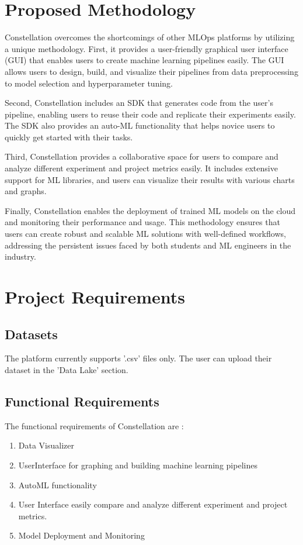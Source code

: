 \documentclass[12pt,a4paper]{report}     %
\begin{document}
\begin{normalsize}
{\section{Proposed Methodology}
Constellation overcomes the shortcomings of other MLOps platforms by utilizing a unique methodology. First, it provides a user-friendly graphical user interface (GUI) that enables users to create machine learning pipelines easily. The GUI allows users to design, build, and visualize their pipelines from data preprocessing to model selection and hyperparameter tuning.
\par
Second, Constellation includes an SDK that generates code from the user's pipeline, enabling users to reuse their code and replicate their experiments easily. The SDK also provides an auto-ML functionality that helps novice users to quickly get started with their tasks.
\par
Third, Constellation provides a collaborative space for users to compare and analyze different experiment and project metrics easily. It includes extensive support for ML libraries, and users can visualize their results with various charts and graphs.
\par
Finally, Constellation enables the deployment of trained ML models on the cloud and monitoring their performance and usage. This methodology ensures that users can create robust and scalable ML solutions with well-defined workflows, addressing the persistent issues faced by both students and ML engineers in the industry.
\section{Project Requirements}
\subsection{Datasets}
The platform currently supports '.csv' files only. The user can upload their dataset in the 'Data Lake' section.
\subsection{Functional Requirements}
The functional requirements of Constellation are :
\begin{enumerate}
\item Data Visualizer
\item  UserInterface for graphing and building machine learning pipelines
\item AutoML functionality
\item User Interface easily compare and analyze different experiment and project metrics.
\item Model Deployment and Monitoring
\end{enumerate}
}
\end{normalsize}
\end{document}
